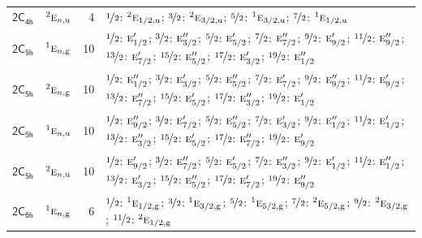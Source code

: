 \documentclass[10pt,a4paper]{article}
\numberwithin{equation}{section}
\newcommand{\grp}[1]{\mathsf{#1}}
\newcommand{\irr}[1]{\text{\normalfont\scshape #1}}
\newcommand{\conjpair}[1]{{}^{#1}}
\newcommand{\ptag}[1]{\mathrm{#1}}
\newlength{\fillwidth}\newlength{\cellwidth}\newlength{\colwidth}
\begin{document}
{\begin{longtable}{@{}llr>{\RaggedRight\arraybackslash}p{\fillwidth}@{}}
\href{2C4h.pdf}{$\grp{2C_{4h}}$} & $\conjpair{2}\irr{e}_{n,\ptag{u}}$ & 4 & $\nicefrac{1}{2}$: $\conjpair{2}\irr{e}_{1/2,\ptag{u}}$; $\nicefrac{3}{2}$: $\conjpair{2}\irr{e}_{3/2,\ptag{u}}$; $\nicefrac{5}{2}$: $\conjpair{1}\irr{e}_{3/2,\ptag{u}}$; $\nicefrac{7}{2}$: $\conjpair{1}\irr{e}_{1/2,\ptag{u}}$\\
\href{2C5h.pdf}{$\grp{2C_{5h}}$} & $\conjpair{1}\irr{e}_{n,\ptag{g}}$ & 10 & $\nicefrac{1}{2}$: $\irr{e}_{1/2}'$; $\nicefrac{3}{2}$: $\irr{e}_{3/2}''$; $\nicefrac{5}{2}$: $\irr{e}_{5/2}'$; $\nicefrac{7}{2}$: $\irr{e}_{7/2}''$; $\nicefrac{9}{2}$: $\irr{e}_{9/2}'$; $\nicefrac{11}{2}$: $\irr{e}_{9/2}''$; $\nicefrac{13}{2}$: $\irr{e}_{7/2}'$; $\nicefrac{15}{2}$: $\irr{e}_{5/2}''$; $\nicefrac{17}{2}$: $\irr{e}_{3/2}'$; $\nicefrac{19}{2}$: $\irr{e}_{1/2}''$\\
\href{2C5h.pdf}{$\grp{2C_{5h}}$} & $\conjpair{2}\irr{e}_{n,\ptag{g}}$ & 10 & $\nicefrac{1}{2}$: $\irr{e}_{1/2}''$; $\nicefrac{3}{2}$: $\irr{e}_{3/2}'$; $\nicefrac{5}{2}$: $\irr{e}_{5/2}''$; $\nicefrac{7}{2}$: $\irr{e}_{7/2}'$; $\nicefrac{9}{2}$: $\irr{e}_{9/2}''$; $\nicefrac{11}{2}$: $\irr{e}_{9/2}'$; $\nicefrac{13}{2}$: $\irr{e}_{7/2}''$; $\nicefrac{15}{2}$: $\irr{e}_{5/2}'$; $\nicefrac{17}{2}$: $\irr{e}_{3/2}''$; $\nicefrac{19}{2}$: $\irr{e}_{1/2}'$\\
\href{2C5h.pdf}{$\grp{2C_{5h}}$} & $\conjpair{1}\irr{e}_{n,\ptag{u}}$ & 10 & $\nicefrac{1}{2}$: $\irr{e}_{9/2}''$; $\nicefrac{3}{2}$: $\irr{e}_{7/2}'$; $\nicefrac{5}{2}$: $\irr{e}_{5/2}''$; $\nicefrac{7}{2}$: $\irr{e}_{3/2}'$; $\nicefrac{9}{2}$: $\irr{e}_{1/2}''$; $\nicefrac{11}{2}$: $\irr{e}_{1/2}'$; $\nicefrac{13}{2}$: $\irr{e}_{3/2}''$; $\nicefrac{15}{2}$: $\irr{e}_{5/2}'$; $\nicefrac{17}{2}$: $\irr{e}_{7/2}''$; $\nicefrac{19}{2}$: $\irr{e}_{9/2}'$\\
\href{2C5h.pdf}{$\grp{2C_{5h}}$} & $\conjpair{2}\irr{e}_{n,\ptag{u}}$ & 10 & $\nicefrac{1}{2}$: $\irr{e}_{9/2}'$; $\nicefrac{3}{2}$: $\irr{e}_{7/2}''$; $\nicefrac{5}{2}$: $\irr{e}_{5/2}'$; $\nicefrac{7}{2}$: $\irr{e}_{3/2}''$; $\nicefrac{9}{2}$: $\irr{e}_{1/2}'$; $\nicefrac{11}{2}$: $\irr{e}_{1/2}''$; $\nicefrac{13}{2}$: $\irr{e}_{3/2}'$; $\nicefrac{15}{2}$: $\irr{e}_{5/2}''$; $\nicefrac{17}{2}$: $\irr{e}_{7/2}'$; $\nicefrac{19}{2}$: $\irr{e}_{9/2}''$\\
\href{2C6h.pdf}{$\grp{2C_{6h}}$} & $\conjpair{1}\irr{e}_{n,\ptag{g}}$ & 6 & $\nicefrac{1}{2}$: $\conjpair{1}\irr{e}_{1/2,\ptag{g}}$; $\nicefrac{3}{2}$: $\conjpair{1}\irr{e}_{3/2,\ptag{g}}$; $\nicefrac{5}{2}$: $\conjpair{1}\irr{e}_{5/2,\ptag{g}}$; $\nicefrac{7}{2}$: $\conjpair{2}\irr{e}_{5/2,\ptag{g}}$; $\nicefrac{9}{2}$: $\conjpair{2}\irr{e}_{3/2,\ptag{g}}$; $\nicefrac{11}{2}$: $\conjpair{2}\irr{e}_{1/2,\ptag{g}}$\\

\end{longtable}}
\end{document}
